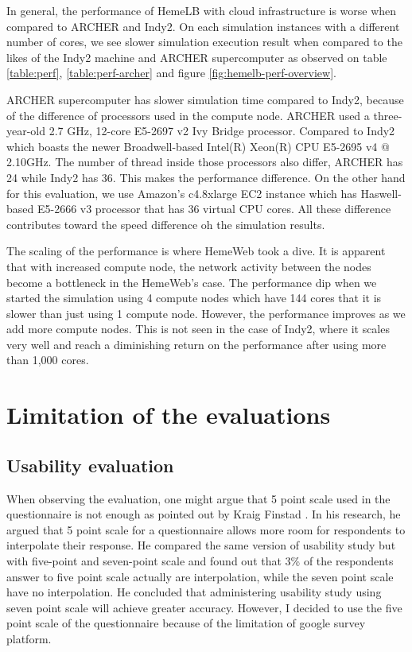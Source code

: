 \vspace{1cm}


In general, the performance of HemeLB with cloud infrastructure is worse when compared to ARCHER and Indy2. On each simulation instances with a different number of cores, we see slower simulation execution result when compared to the likes of the Indy2 machine and ARCHER supercomputer as observed on table \ref{table:perf}, \ref{table:perf-archer} and figure \ref{fig:hemelb-perf-overview}.

ARCHER supercomputer has slower simulation time compared to Indy2, because of the difference of processors used in the compute node. ARCHER used a three-year-old 2.7 GHz, 12-core E5-2697 v2 Ivy Bridge processor. Compared to Indy2 which boasts the newer Broadwell-based Intel(R) Xeon(R) CPU E5-2695 v4 @ 2.10GHz. The number of thread inside those processors also differ, ARCHER has 24 while Indy2 has 36. This makes the performance difference. On the other hand for this evaluation, we use Amazon's c4.8xlarge EC2 instance which has Haswell-based E5-2666 v3 processor that has 36 virtual CPU cores. All these difference contributes toward the speed difference oh the simulation results.

The scaling of the performance is where HemeWeb took a dive. It is apparent that with increased compute node, the network activity between the nodes become a bottleneck in the HemeWeb's case. The performance dip when we started the simulation using 4 compute nodes which have 144 cores that it is slower than just using 1 compute node. However, the performance improves as we add more compute nodes. This is not seen in the case of Indy2, where it scales very well and reach a diminishing return on the performance after using more than 1,000 cores.




\section {Limitation of the evaluations}

\subsection{Usability evaluation}

When observing the evaluation, one might argue that 5 point scale used in the questionnaire is not enough as pointed out by Kraig Finstad \cite{finstad2010response}. In his research, he argued that 5 point scale for a questionnaire allows more room for respondents to interpolate their response. He compared the same version of usability study but with five-point and seven-point scale and found out that 3\% of the respondents answer to five point scale actually are interpolation, while the seven point scale have no interpolation. He concluded that administering usability study using seven point scale will achieve greater accuracy. However, I decided to use the five point scale of the questionnaire because of the limitation of google survey platform. 

